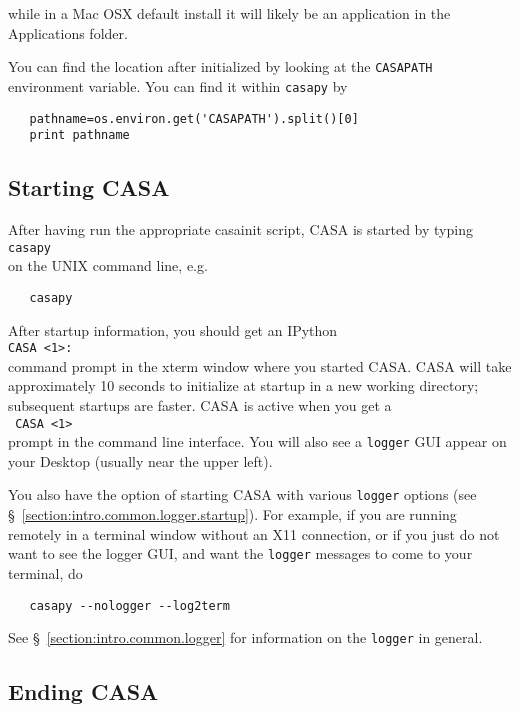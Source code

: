 while in a Mac OSX default install it will likely be an 
application in the Applications folder.

You can find the location after initialized by looking at
the {\tt CASAPATH} environment variable.  You can find
it within {\tt casapy} by
\small
\begin{verbatim}
   pathname=os.environ.get('CASAPATH').split()[0]
   print pathname
\end{verbatim}
\normalsize

\subsection{Starting CASA}
\label{section:intro.basics.starting}

After having run the appropriate casainit script, CASA is started by
typing\\ {\tt casapy}\\ on the UNIX command line, e.g.
\small
\begin{verbatim}
   casapy
\end{verbatim}
\normalsize
After startup information,
you should get an IPython\\ {\tt CASA <1>:}\\ command prompt in the
xterm window where you started CASA. CASA will take approximately 10
seconds to initialize at startup in a new working directory;
subsequent startups are faster.  CASA is active when you get a\\ {\tt
CASA <1>}\\ prompt in the command line interface.  You will also
see a {\tt logger} GUI appear on your Desktop (usually near the
upper left).  

You also have the option of starting CASA with various {\tt logger}
options (see \S~\ref{section:intro.common.logger.startup}).  For
example, if you are running remotely in a terminal window without
an X11 connection, or if you just do not want to see the logger GUI,
and want the {\tt logger} messages to come to your terminal, do
\small
\begin{verbatim}
   casapy --nologger --log2term
\end{verbatim}
\normalsize

See \S~\ref{section:intro.common.logger} for information on the
{\tt logger} in general.

\subsection{Ending CASA}
\label{section:intro.basics.ending}

